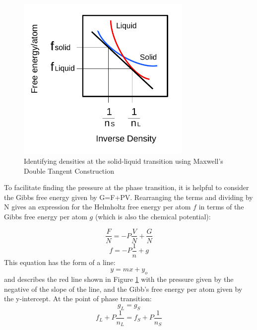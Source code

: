 \documentclass[double,12pt]{beavtex}
\begin{document}
\begin{figure}[h!]
    \centering
     \includegraphics[height=8cm]{figs/MaxwellDTC-Fig1.pdf}
    \caption{Identifying densities at the solid-liquid transition using 
    Maxwell's Double Tangent Construction}
    \label{fig:MaxwellDT}
  \end{figure}

To facilitate finding the pressure at the phase transition, 
it is helpful to consider the Gibbs free energy given by G=F+PV. 
Rearranging the terms and dividing by N gives an  expression for the 
Helmholtz free energy per atom $f$ in terms of the Gibbs free energy 
per atom  $g$ (which is also the chemical potential):  

\begin{displaymath}{\frac{F}{N}=-P\frac{V}{N}+\frac{G}{N}}\end{displaymath} 
\begin{displaymath}{f=-P\frac{1}{n}+g}\end{displaymath}
This equation has the form of a line:
\begin{displaymath}{y=mx+y_o}\end{displaymath}
and describes the red line shown in Figure \ref{fig:MaxwellDT} with the 
pressure given by the negative of the slope of the line, and the Gibb's 
free energy per atom given by the y-intercept. At the point of phase transition:
\begin{displaymath}{g_L=g_S}\end{displaymath} 
\begin{displaymath}{f_L+P\frac{1}{n_L}=f_S+P\frac{1}{n_S}}\end{displaymath}
\end{document}
